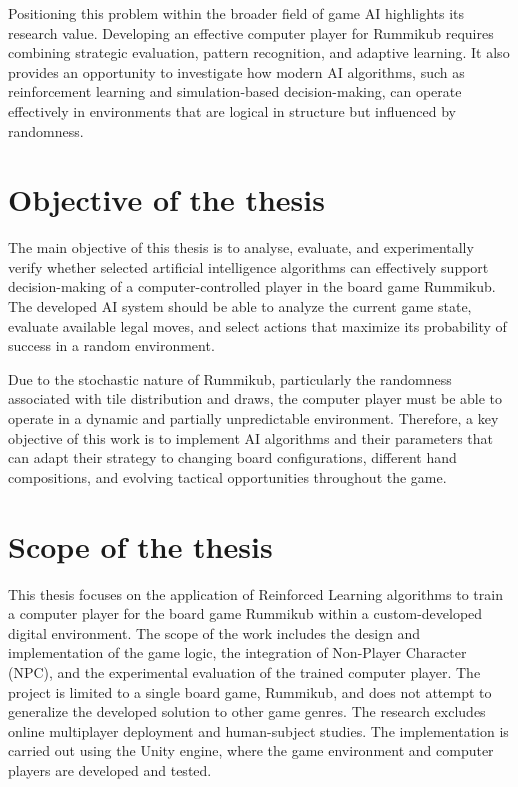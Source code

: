 Positioning this problem within the broader field of game AI highlights its research value. Developing an effective computer player for Rummikub requires combining strategic evaluation, pattern recognition, and adaptive learning. It also provides an opportunity to investigate how modern AI algorithms, such as reinforcement learning and simulation-based decision-making, can operate effectively in environments that are logical in structure but influenced by randomness.

\section{Objective of the thesis }
The main objective of this thesis is to analyse, evaluate, and experimentally verify whether selected artificial intelligence algorithms can effectively support decision-making of a computer-controlled player in the board game Rummikub. The developed AI system should be able to analyze the current game state, evaluate available legal moves, and select actions that maximize its probability of success in a random environment.

Due to the stochastic nature of Rummikub, particularly the randomness associated with tile distribution and draws, the computer player must be able to operate in a dynamic and partially unpredictable environment. Therefore, a key objective of this work is to implement AI algorithms and their parameters that can adapt their strategy to changing board configurations, different hand compositions, and evolving tactical opportunities throughout the game.

\section{Scope of the thesis} %
This thesis focuses on the application of Reinforced Learning algorithms to train a computer player for the board game Rummikub within a custom-developed digital environment. The scope of the work includes the design and implementation of the game logic, the integration of Non-Player Character (NPC), and the experimental evaluation of the trained computer player.
The project is limited to a single board game, Rummikub, and does not attempt to generalize the developed solution to other game genres. The research excludes online multiplayer deployment and human-subject studies. The implementation is carried out using the Unity engine, where the game environment and computer players are developed and tested. 

